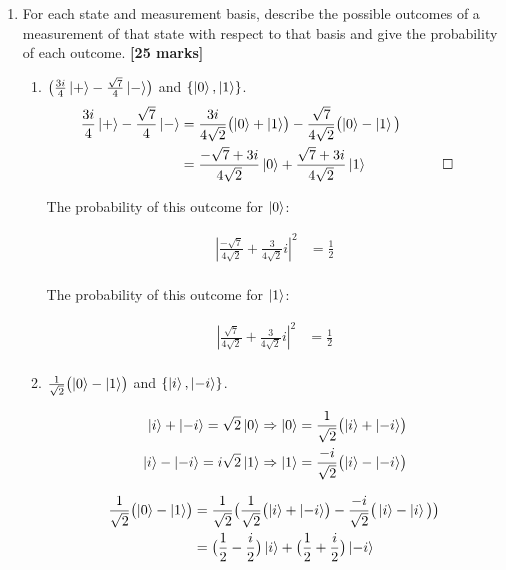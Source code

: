 \documentclass{article}
\begin{document}
\begin{enumerate}
	\item \label{ex2} For each state and measurement basis, describe the possible outcomes
	of a measurement of that state with respect to that basis and give the
	probability of each outcome. \hfill{\bf [25 marks]}\smallskip
	
	\begin{enumerate}

		\item $\bigl( \frac{3i}{4} \ket{+} - \frac{\sqrt{7}}{4} \ket{-} \bigr) $ and $\{\ket0, \ket1\}$.
\begin{align*}
   \frac{3i}{4} \ket{+} - \frac{\sqrt{7}}{4} \ket{-} &= \frac{3i}{4\sqrt{2}} \bigl(\ket{0} + \ket{1}\bigr) - \frac{\sqrt{7}}{4\sqrt{2}} \bigl(\ket{0} - \ket{1}\bigl) \\
    &= \frac{-\sqrt{7} + 3i}{4\sqrt{2}} \ket{0} + \frac{\sqrt{7} + 3i}{4\sqrt{2}} \ket{1}  &&\qedhere
\end{align*}

The probability of this outcome for $\ket{0}$:

\begin{align*}
  |\frac{-\sqrt{7}}{4\sqrt{2}} + \frac{3}{4\sqrt{2}}i|^2 &= \frac{1}{2} \\
\end{align*}

The probability of this outcome for $\ket{1}$:

\begin{align*}
  |\frac{\sqrt{7}}{4\sqrt{2}} + \frac{3}{4\sqrt{2}}i|^2 &= \frac{1}{2} \\
\end{align*}

		\item $ \frac{1}{\sqrt{2}} \bigl( \ket{0} - \ket{1} \bigr) $ and $\{\ket{i}, \ket{-i}\}$.

\begin{align*}
	\ket{i} + \ket{-i} = \sqrt{2} \ket{0} \Rightarrow \ket{0} = \frac{1}{\sqrt{2}} \bigl(\ket{i} + \ket{-i}\bigr) \\
        \ket{i} - \ket{-i} = i\sqrt{2} \ket{1} \Rightarrow \ket{1} = \frac{-i}{\sqrt{2}} \bigl(\ket{i} - \ket{-i}\bigr) \\
\end{align*}

\begin{align*}
	\frac{1}{\sqrt{2}} \bigl( \ket{0} - \ket{1} \bigr) &= \frac{1}{\sqrt{2}} \bigl(\frac{1}{\sqrt{2}} \bigl(\ket{i} + \ket{-i}\bigr) - \frac{-i}{\sqrt{2}}\bigr(\ket{i} - \ket{i}\bigl)\bigl) \\
	&= \bigl(\frac{1}{2} - \frac{i}{2}\bigr)\ket{i} + \bigl(\frac{1}{2} + \frac{i}{2}\bigr)\ket{-i} \\ 
\end{align*}


\end{enumerate}
\end{enumerate}
\end{document}
